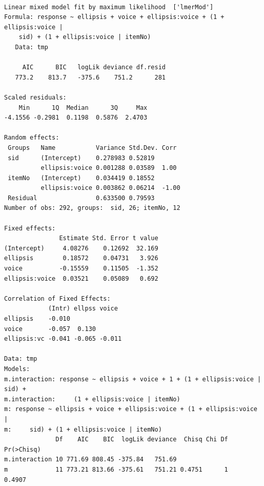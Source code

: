 \documentclass[11pt]{article}
\begin{document}
\begin{verbatim}

Linear mixed model fit by maximum likelihood  ['lmerMod']
Formula: response ~ ellipsis + voice + ellipsis:voice + (1 + ellipsis:voice |  
    sid) + (1 + ellipsis:voice | itemNo)
   Data: tmp

     AIC      BIC   logLik deviance df.resid 
   773.2    813.7   -375.6    751.2      281 

Scaled residuals: 
    Min      1Q  Median      3Q     Max 
-4.1556 -0.2981  0.1198  0.5876  2.4703 

Random effects:
 Groups   Name           Variance Std.Dev. Corr 
 sid      (Intercept)    0.278983 0.52819       
          ellipsis:voice 0.001288 0.03589  1.00 
 itemNo   (Intercept)    0.034419 0.18552       
          ellipsis:voice 0.003862 0.06214  -1.00
 Residual                0.633500 0.79593       
Number of obs: 292, groups:  sid, 26; itemNo, 12

Fixed effects:
               Estimate Std. Error t value
(Intercept)     4.08276    0.12692  32.169
ellipsis        0.18572    0.04731   3.926
voice          -0.15559    0.11505  -1.352
ellipsis:voice  0.03521    0.05089   0.692

Correlation of Fixed Effects:
            (Intr) ellpss voice 
ellipsis    -0.010              
voice       -0.057  0.130       
ellipsis:vc -0.041 -0.065 -0.011

Data: tmp
Models:
m.interaction: response ~ ellipsis + voice + 1 + (1 + ellipsis:voice | sid) + 
m.interaction:     (1 + ellipsis:voice | itemNo)
m: response ~ ellipsis + voice + ellipsis:voice + (1 + ellipsis:voice | 
m:     sid) + (1 + ellipsis:voice | itemNo)
              Df    AIC    BIC  logLik deviance  Chisq Chi Df Pr(>Chisq)
m.interaction 10 771.69 808.45 -375.84   751.69                         
m             11 773.21 813.66 -375.61   751.21 0.4751      1     0.4907
\end{verbatim}
\end{document}

